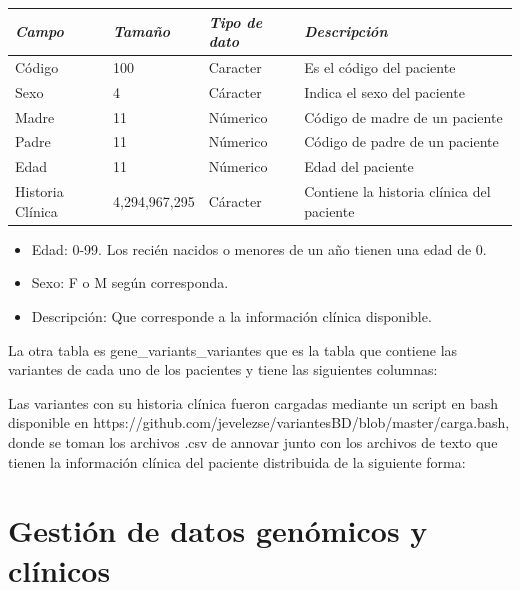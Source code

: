 \begin{table}[]
	\begin{tabular}{|l|l|l|l|}
		\hline
		\textit{\textbf{Campo}} & \textit{\textbf{Tamaño}} & \textit{\textbf{Tipo de dato}} & \textit{\textbf{Descripción}}             \\ \hline
		Código                  & 100                      & Caracter                       & Es el código del paciente                 \\ \hline
		Sexo                    & 4                        & Cáracter                       & Indica el sexo del paciente               \\ \hline
		Madre                   & 11                       & Númerico                       & Código de madre de un paciente            \\ \hline
		Padre                   & 11                       & Númerico                       & Código de padre de un paciente            \\ \hline
		Edad                    & 11                       & Númerico                       & Edad del paciente                         \\ \hline
		Historia Clínica        & 4,294,967,295            & Cáracter                       & Contiene la historia clínica del paciente \\ \hline
	\end{tabular}
\end{table}

\begin{itemize}
	\item Edad: 0-99. Los recién nacidos  o menores de un año tienen una edad de 0.
	\item Sexo: F o M según corresponda.
	\item Descripción: Que corresponde a la información clínica disponible.
\end{itemize} 

La otra tabla es gene\_variants\_variantes que es la tabla que contiene las variantes de cada uno de los pacientes y tiene las siguientes columnas:




Las variantes con su historia clínica fueron cargadas mediante un script en bash disponible en https://github.com/jevelezse/variantesBD/blob/master/carga.bash, donde se toman los archivos .csv de annovar junto con los archivos de texto que tienen la información clínica del paciente distribuida de la siguiente forma:

\section{Gestión de datos genómicos y clínicos}

